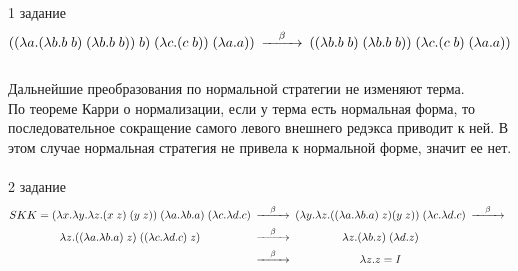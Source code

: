 \documentclass{article}
\begin{document}
\\ 1 задание
$$
  \begin{CD}
    ((\lambda a.(\lambda b.b\;b)\;(\lambda b.b\;b))\;b)\;(\lambda c.(c\;b))\;(\lambda a.a)) @>\beta>> ((\lambda b.b\;b)\;(\lambda b.b\;b))\;(\lambda c.(c\;b)\;(\lambda a.a))
  \end{CD}  
$$
\\Дальнейшие преобразования по нормальной стратегии не изменяют терма.
\\По теореме Карри о нормализации, если у терма есть нормальная форма, то последовательное сокращение самого левого внешнего редэкса приводит к ней. В этом случае нормальная стратегия не привела к нормальной форме, значит ее нет.
\\
\\ 2 задание
$$
\begin{CD}
    S K K = (\lambda x.\lambda y. \lambda z.(x\;z)\;(y\;z))\;(\lambda a.\lambda b.a)\;(\lambda c.\lambda d.c)@>\beta>>(\lambda y. \lambda z.((\lambda a.\lambda b.a)\;z)(y\;z))\;(\lambda c.\lambda d.c)@>\beta>>\\ \lambda z.((\lambda a.\lambda b.a)\;z)\;((\lambda c.\lambda d.c)\;z)@>\beta>>\lambda z.(\lambda b.z)\;(\lambda d.z)\\ @>\beta>>
    \lambda z.z = I
  \end{CD}
$$
\end{document}
